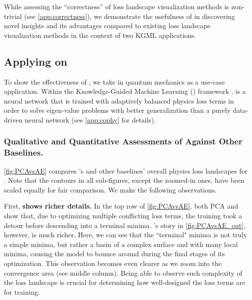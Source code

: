 \documentclass[letterpaper]{article} %
\begin{document}
While assessing the ``correctness” of  loss landscape visualization methods is non-trivial (see \cref{app:correctness}), we demonstrate the usefulness of \proposedautencoder{} in discovering novel insights and its advantages compared to existing loss landscape visualization methods in the context of two KGML applications. 

            \subsection{Applying \proposedautencoder{} on \cophy{}} \label{ss:cophy_landscape2}

            To show the effectiveness of \proposedautencoder{}, we take \cophy{} \cite{elhamod2022cophy} in quantum mechanics as a use-case application. Within the Knowledge-Guided Machine Learning (\SGML{}) framework \citep{tgds}, \cophy{} is a neural network that is trained with adaptively balanced physics loss terms in order to solve eigen-value problems with better generalization than a purely data-driven neural network (see \cref{app:cophy} for details).  


            
            \subsubsection{Qualitative and Quantitative Assessments of \proposedautencoder{} Against Other Baselines.}
            \label{ss:proposedvsbaselines}
                        \cref{fig:PCAvsAE} compares \proposedautencoder{}'s and other baselines' overall physics loss landscapes for \cophy{}. Note that the contours in all sub-figures, except the zoomed-in ones, have been scaled equally for fair comparison. We make the following observations.

            First, \textbf{\proposedautencoder{} shows richer details.} In the top row of \cref{fig:PCAvsAE}, both PCA and \proposedautencoder{} show that, due to optimizing multiple conflicting loss terms, the training took a detour before descending into a terminal minima. \proposedautencoder{}'s story in \cref{fig:PCAvsAE_out}, however, is much richer. Here, we can see that the ``terminal" minima is not truly a simple minima, but rather a basin of a complex surface and with many local minima, causing the model to bounce around during the final stages of its optimization. This observation becomes even clearer as we zoom into the convergence area (see middle column). Being able to observe such complexity of the loss landscape is crucial for determining how well-designed the loss terms are for training.
            
\end{document}
